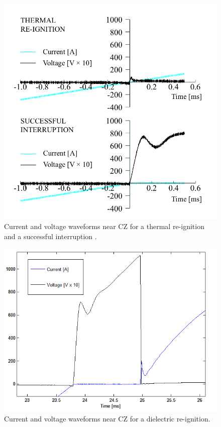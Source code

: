 \documentclass[10pt,b5paper,twoside]{article}
\begin{document}
\begin{figure}[H]
\centering
\includegraphics[scale=0.32]{Bilder/Results/differentInterruptions.png}
\caption{Current and voltage waveforms near CZ for a thermal re-ignition and a successful interruption \cite{bib:AFIMVLBA}.} \label{fig:CurrentAndVoltageWaveform}
\end{figure}

\begin{figure}[H]
\centering
\includegraphics[scale=0.7]{Bilder/Results/DRplot2.PNG}
\caption{Current and voltage waveforms near CZ for a dielectric re-ignition.} \label{fig:CurrentAndVoltageDRWaveform}
\end{figure}
\end{document}
